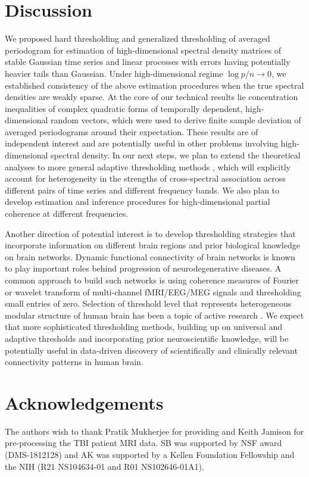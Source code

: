 \section{Discussion}\label{sec:discussion}
We proposed hard thresholding and generalized thresholding of averaged periodogram for estimation of high-dimensional spectral density matrices of stable Gaussian time series and linear processes with errors having potentially heavier tails than Gaussian. Under high-dimensional regime $\log p /n \rightarrow 0$, we established consistency of the above estimation procedures when the true spectral densities are weakly sparse. At the core of our technical results lie concentration inequalities of  complex quadratic forms of temporally dependent, high-dimensional random vectors, which were used to derive finite sample deviation of averaged periodograms around their expectation. These results  are of independent interest and are potentially useful in other problems involving high-dimensional spectral density. In our next steps, we plan to extend the theoretical analyses to more general adaptive thresholding methods \citep{cai2011adaptive}, which will explicitly account for heterogeneity in the strengths of cross-spectral association across different pairs of time series and different frequency bands. We also plan to develop estimation and inference procedures for high-dimensional partial coherence at different frequencies.

Another direction of potential interest is to develop thresholding strategies that incorporate  information on different brain regions and prior biological knowledge on brain networks. Dynamic functional connectivity of brain networks is known to play important roles behind progression of neurodegenerative diseases. A common approach to build such networks is using coherence measures of Fourier or wavelet transform of multi-channel fMRI/EEG/MEG signals and thresholding small entries of zero. Selection of threshold level that represents heterogeneous modular structure of human brain has been a topic of active research \citep{bordier2017graph}. We expect that more sophisticated thresholding methods, building up on universal and adaptive thresholds and incorporating prior neuroscientific knowledge, will be potentially useful in  data-driven discovery of scientifically and clinically relevant connectivity patterns in human brain.

\section*{Acknowledgements} The authors wish to thank Pratik Mukherjee for providing and Keith Jamison for pre-processing the TBI patient MRI data.  SB was supported by NSF award (DMS-1812128) and AK was supported by a Kellen Foundation Fellowship and the NIH (R21 NS104634-01 and R01 NS102646-01A1).